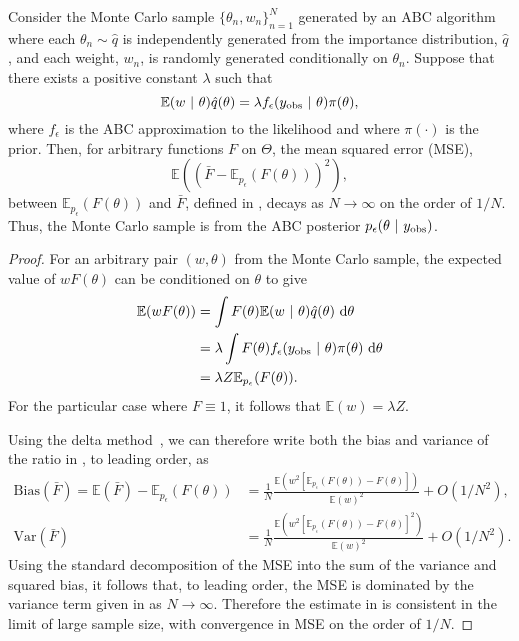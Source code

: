 \documentclass[review]{siamonline190516}
\begin{document}
\begin{lemma}
\label{lemma:MC}
Consider the Monte Carlo sample $\{ \theta_n, w_n \}_{n=1}^N$ generated by an ABC algorithm where each $\theta_n \sim \hat q$ is independently generated from the importance distribution, $\hat q$, and each weight, $w_n$, is randomly generated conditionally on $\theta_n$.
Suppose that there exists a positive constant $\lambda$ such that
\begin{equation}
\label{eq:ABCCondition}
\mathbb E(w~|~\theta) \hat q(\theta) = \lambda f_\epsilon(\obs y~|~\theta) \pi(\theta),
\end{equation}
where $f_\epsilon$ is the ABC approximation to the likelihood and where $\pi(\cdot)$ is the prior.
Then, for arbitrary functions $F$ on $\Theta$, the mean squared error (MSE),
\[
\mathbb E\left( \left( \bar F - \mathbb E_{p_\epsilon} \left(F(\theta) \right) \right)^2 \right),
\]
between $\mathbb E_{p_\epsilon}(F(\theta))$ and $\bar F$, defined in , decays as $N \rightarrow \infty$ on the order of $1/N$.
Thus, the Monte Carlo sample is from the ABC posterior $p_\epsilon(\theta~|~y_{\mathrm{obs}})$.
\end{lemma}
\begin{proof}
For an arbitrary pair $(w, \theta)$ from the Monte Carlo sample, the expected value of $w F(\theta)$ can be conditioned on $\theta$ to give 
\begin{align*}
\mathbb E(w F(\theta)) 
&= \int F(\theta) \mathbb E(w~|~\theta) \hat q(\theta) ~\mathrm d\theta 
\\ 
&= \lambda \int F(\theta) f_\epsilon(y_{\mathrm{obs}}~|~\theta) \pi(\theta) ~\mathrm d\theta 
\\
&= \lambda Z \mathbb E_{p_\epsilon}(F(\theta)).
\end{align*}
For the particular case where $F \equiv 1$, it follows that $\mathbb E(w) = \lambda Z$.

Using the delta method~\cite{Seltman2018}, we can therefore write both the bias and variance of the ratio in , to leading order, as
\begin{subequations}
\label{eq:estimate:MSE}
\begin{align}
\mathrm{Bias}(\bar F) = \mathbb E \left( \bar F \right) - \mathbb E_{p_\epsilon}(F(\theta))
&= 
\frac{1}{N} \frac{\mathbb E \left( w^2 \left[ \mathbb E_{p_\epsilon}(F(\theta)) - F \left(\theta\right) \right] \right)}{\mathbb E(w)^2} + O(1/N^2),
\label{eq:estimate:bias}
\\
\mathrm{Var} \left( \bar F \right)
&=
\frac{1}{N} \frac{\mathbb E \left( w^2 \left[ \mathbb E_{p_\epsilon}(F(\theta)) - F\left(\theta\right) \right]^2 \right) }{\mathbb E(w)^2} + O(1/N^2).
\label{eq:estimate:variance}
\end{align}
\end{subequations}
Using the standard decomposition of the MSE into the sum of the variance and squared bias, it follows that, to leading order, the MSE is dominated by the variance term given in  as $N \rightarrow \infty$.
Therefore the estimate in  is consistent in the limit of large sample size, with convergence in MSE on the order of $1/N$. 
\end{proof}
\end{document}
